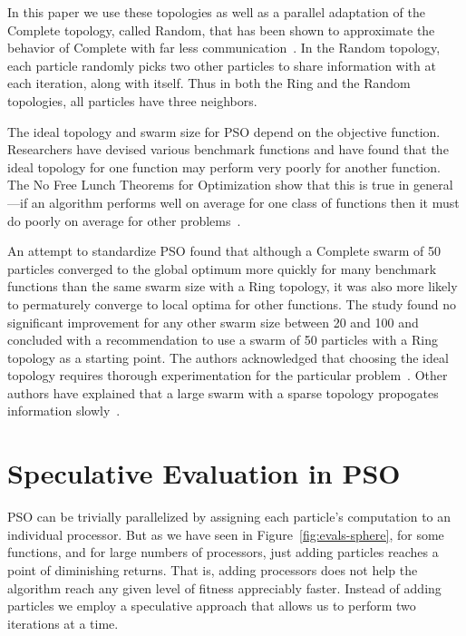 \documentclass[smallcondensed]{svjour3}
\newcommand{\fig}[1]{Figure~\ref{fig:#1}}
\begin{document}
In this paper we use these topologies as well as a parallel adaptation of the
Complete topology, called Random, that has been shown to approximate the
behavior of Complete with far less
communication~\citep{mcnabb-2009-large-particle-swarms}.  In the Random
topology, each particle randomly picks two other particles to share information
with at each iteration, along with itself.  Thus in both the Ring and the
Random topologies, all particles have three neighbors.

The ideal topology and swarm size for PSO depend on the objective function.
Researchers have devised various benchmark functions and have found that the
ideal topology for one function may perform very poorly for another function.
The No Free Lunch Theorems for Optimization show that this is true in
general---if an algorithm performs well on average for one class of functions
then it must do poorly on average for other
problems~\cite{wolpert-1997-nfl-for-optimization}.

An attempt to standardize PSO found that although a Complete swarm of 50
particles converged to the global optimum more quickly for many benchmark
functions than the same swarm size with a Ring topology, it was also more
likely to permaturely converge to local optima for other functions.  The study
found no significant improvement for any other swarm size between 20 and 100
and concluded with a recommendation to use a swarm of 50 particles with a Ring
topology as a starting point.  The authors acknowledged that choosing the ideal
topology requires thorough experimentation for the particular
problem~\cite{bratton-2007-defining-a-standard-for-pso}.  Other authors have
explained that a large swarm with a sparse topology propogates information
slowly~\cite{montes-de-oca-2009-frankensteins-pso}.

\section{Speculative Evaluation in PSO}
\label{sec:sepso}

PSO can be trivially parallelized by assigning each particle's computation to
an individual processor.  But as we have seen in \fig{evals-sphere}, for some
functions, and for large numbers of processors, just adding particles reaches a
point of diminishing returns.  That is, adding processors does not help the
algorithm reach any given level of fitness appreciably faster.  Instead of
adding particles we employ a speculative approach that allows us to perform
two iterations at a time.
\end{document}
